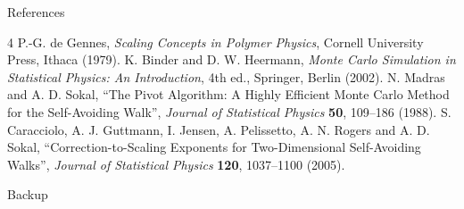 \documentclass[aspectratio=169,11pt]{beamer}
\begin{document}
\begin{frame}{References}
\small
\begin{thebibliography}{4}
\setlength{\itemsep}{3mm}
 P.-G. de Gennes, \emph{Scaling Concepts in Polymer Physics}, Cornell University Press, Ithaca (1979).
 K. Binder and D. W. Heermann, \emph{Monte Carlo Simulation in Statistical Physics: An Introduction}, 4th ed., Springer, Berlin (2002).
 N. Madras and A. D. Sokal, ``The Pivot Algorithm: A Highly Efficient Monte Carlo Method for the Self-Avoiding Walk'', \emph{Journal of Statistical Physics} \textbf{50}, 109--186 (1988).
 S. Caracciolo, A. J. Guttmann, I. Jensen, A. Pelissetto, A. N. Rogers and A. D. Sokal, ``Correction-to-Scaling Exponents for Two-Dimensional Self-Avoiding Walks'', \emph{Journal of Statistical Physics} \textbf{120}, 1037--1100 (2005).
\end{thebibliography}
\end{frame}

\begin{frame}
\centering
{\Huge Backup}
\end{frame}
\end{document}
